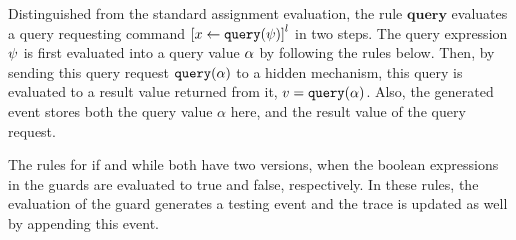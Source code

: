 Distinguished from the standard assignment evaluation, 
the rule $\textbf{query}$ 
evaluates a query requesting command $\clabel{\assign{x}{\query(\qexpr)}}^l$ in two steps.
The query expression $\psi$ is first evaluated into a query value $\alpha$ by following the rules below.
Then, by sending this query request ${\tt query}(\alpha)$  to a hidden mechanism, this query is evaluated to a result value returned from it, $v = {\tt query}(\alpha)$.
Also, the generated event stores both the query value $\alpha$ here, and the result value of the query request.

The rules for if and while both have two versions, 
when the boolean expressions in the guards are evaluated to true and false, respectively. 
In these rules, the evaluation of the guard generates a testing event and the trace is updated as well by appending this event.


